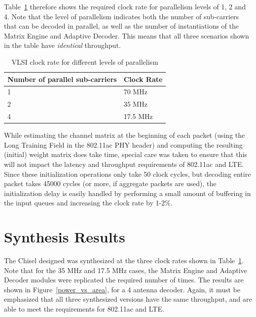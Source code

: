 \documentclass[journal]{IEEEtran}
\begin{document}
Table~\ref{clock_rate_table} therefore shows the required clock rate for parallelism levels of 1, 2 and 4. Note that the level of parallelism indicates both the number of sub-carriers that can be decoded in parallel, as well as the number of instantiations of the Matrix Engine and Adaptive Decoder. This means that all three scenarios shown in the table have {\em identical} throughput.

\begin{table}[!h]
\caption{VLSI clock rate for different levels of parallelism}
\label{clock_rate_table}
\centering
\begin{tabular}{l l}
\hline
Number of parallel sub-carriers & Clock Rate \\
\hline
1 & 70 MHz \\
2 & 35 MHz \\
4 & 17.5 MHz \\
\hline
\end{tabular}
\end{table}

While estimating the channel matrix at the beginning of each packet (using the Long Training Field in the 802.11ac PHY header) and computing the resulting (initial) weight matrix does take time, special care was taken to ensure that this will not impact the latency and throughput requirements of 802.11ac and LTE. Since these initialization operations only take 50 clock cycles, but decoding entire packet takes 45000 cycles (or more, if aggregate packets are used), the initialization delay is easily handled by performing a small amount of buffering in the input queues and increasing the clock rate by 1-2\%.


\section{Synthesis Results}

The Chisel designed was synthesized at the three clock rates shown in Table~\ref{clock_rate_table}. Note that for the 35 MHz and 17.5 MHz cases, the Matrix Engine and Adaptive Decoder modules were replicated the required number of times. The results are shown in Figure~\ref{power_vs_area}, for a 4 antenna decoder. Again, it must be emphasized that all three synthesized versions have the same throughput, and are able to meet the requirements for 802.11ac and LTE.
\end{document}
